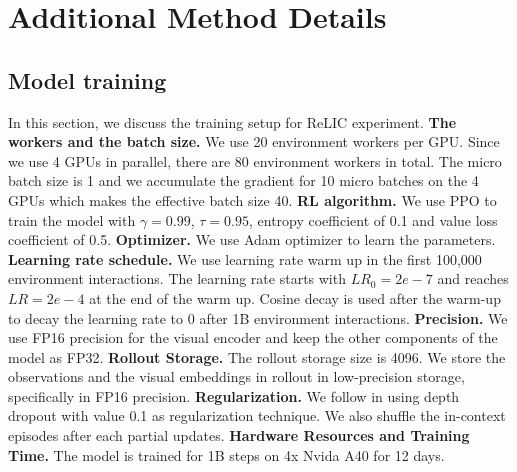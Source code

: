 \documentclass{article}
\newcommand{\method}{ReLIC\xspace}
\begin{document}
\section{Additional Method Details}
\subsection{Model training}
In this section, we discuss the training setup for \method experiment.
\textbf{The workers and the batch size.} We use 20 environment workers per GPU. Since we use 4 GPUs in parallel, there are 80 environment workers in total. The micro batch size is 1 and we accumulate the gradient for 10 micro batches on the 4 GPUs which makes the effective batch size 40.
\textbf{RL algorithm.} We use PPO \cite{schulman2017proximal} to train the model with $\gamma=0.99$, $\tau=0.95$, entropy coefficient of 0.1 and value loss coefficient of 0.5.
\textbf{Optimizer.} We use Adam \cite{kingma2014adam} optimizer to learn the parameters.
\textbf{Learning rate schedule.} We use learning rate warm up in the first 100,000 environment interactions. The learning rate starts with $LR_0=2e-7$ and reaches $LR=2e-4$ at the end of the warm up. Cosine decay \cite{loshchilov2017sgdr} is used after the warm-up to decay the learning rate to $0$ after 1B environment interactions.
\textbf{Precision.} We use FP16 precision for the visual encoder and keep the other components of the model as FP32.
\textbf{Rollout Storage.} The rollout storage size is 4096. We store the observations and the visual embeddings in rollout in low-precision storage, specifically in FP16 precision.
\textbf{Regularization.} We follow \cite{reed2022generalist} in using depth dropout \cite{huang2016deep} with value 0.1 as regularization technique. We also shuffle the in-context episodes after each partial updates.
\textbf{Hardware Resources and Training Time.} The model is trained for 1B steps on 4x Nvida A40 for 12 days.
\end{document}
